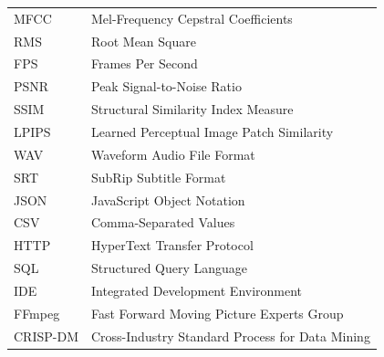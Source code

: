 \begin{longtable}{|p{4cm}|p{10cm}|}
MFCC & Mel-Frequency Cepstral Coefficients \\
RMS & Root Mean Square \\
FPS & Frames Per Second \\
PSNR & Peak Signal-to-Noise Ratio \\
SSIM & Structural Similarity Index Measure \\
LPIPS & Learned Perceptual Image Patch Similarity \\
WAV & Waveform Audio File Format \\
SRT & SubRip Subtitle Format \\
JSON & JavaScript Object Notation \\
CSV & Comma-Separated Values \\
HTTP & HyperText Transfer Protocol \\
SQL & Structured Query Language \\
IDE & Integrated Development Environment \\
FFmpeg & Fast Forward Moving Picture Experts Group \\
CRISP-DM & Cross-Industry Standard Process for Data Mining \\
\hline
\end{longtable}